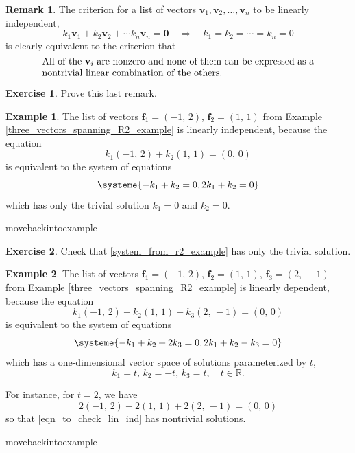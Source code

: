 \documentclass[a4paper,11pt]{book}
\theoremstyle{definition}
\newtheorem{exercise}{Exercise}
\newtheorem{example_environment}{Example}[chapter]
\newtheorem{remark}[theorem]{Remark}
\newcommand{\be}{\begin{equation}}
\newcommand{\ee}{\end{equation}}
\newcommand{\ve}[1]{\mathbf{#1}}
\newenvironment{example}
	{
		\begin{oframed} 
		\begin{example_environment}
	}
	{
		\end{example_environment}
		\end{oframed}
	}
\begin{document}
\begin{remark} \label{crit_ind} The criterion for a list of vectors $\ve{v}_1, \ve{v}_2, \ldots, \ve{v}_n$ to be linearly independent, 
\[
  k_1 \ve{v}_1 + k_2 \ve{v}_2 + \cdots k_n \ve{v}_n = \ve{0} \quad \Rightarrow \quad k_1 = k_2 = \cdots = k_n = 0
\]
is clearly equivalent to the criterion that 
\[
 \begin{minipage}{10cm} { All of the $\ve{v}_i$ are nonzero and none of them can be expressed as a nontrivial linear combination of the others.} \end{minipage}
\]
\end{remark}
\begin{exercise} Prove this last remark.

\end{exercise}

\begin{example} The list of vectors $\ve{f}_1 = (-1, \, 2)$, $\ve{f}_2 = (1, \,1)$ from Example \ref{three_vectors_spanning_R2_example} is linearly independent, because the equation
\[
 k_1 (-1, \, 2) + k_2 (1, \, 1) = (0, \, 0)
\]
is equivalent to the system of equations
\be \label{system_from_r2_example}
\systeme{-k_1 + k_2 = 0, 2k_1 + k_2 = 0}
\ee
which has only the trivial solution $k_1 = 0$ and $k_2 = 0$.

\end{example}movebackintoexample
\begin{exercise} Check that \eqref{system_from_r2_example} has only the trivial solution.
\end{exercise}
\begin{example} \label{example_about_lin_dep_1} The list of vectors $\ve{f}_1 = (-1, \, 2)$, $\ve{f}_2 = (1, \,1)$, $\ve{f}_3 = (2, \, -1)$ from Example  \ref{three_vectors_spanning_R2_example} is linearly dependent, because the equation
\be \label{eqn_to_check_lin_ind}
 k_1 (-1, \, 2) + k_2 (1, \, 1) + k_3 (2, \, -1) = (0, \, 0)
\ee
is equivalent to the system of equations
\be \label{system_from_r2_example_new}
\systeme{-k_1 + k_2 + 2k_3 = 0, 2k_1 + k_2 - k_3 = 0}
\ee
which has a one-dimensional vector space of solutions parameterized by $t$, 
\be \label{supposed_soln}
 k_1 = t, \, k_2 = -t, \, k_3 = t, \quad t \in \mathbb{R}.
\ee

For instance, for $t=2$, we have
\[
 2 (-1, \, 2) - 2 (1, \, 1) + 2 (2, \, -1) = (0, \, 0)
\]
so that \eqref{eqn_to_check_lin_ind} has nontrivial solutions.
\end{example}movebackintoexample
\end{document}
